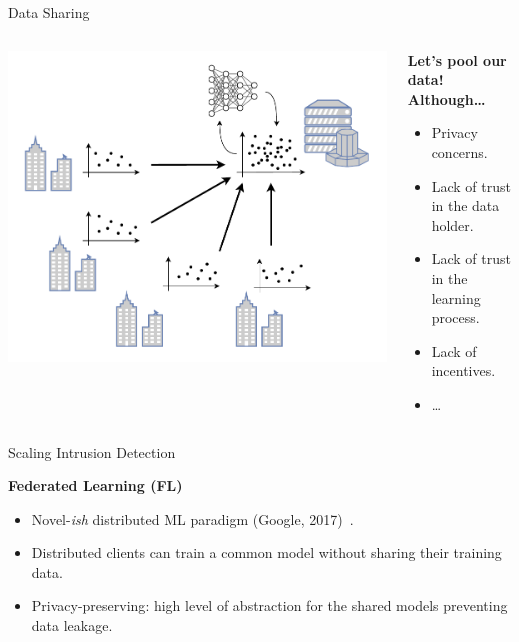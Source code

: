 \begin{frame}{Data Sharing}
\begin{columns}
  \begin{column}{0.5\textwidth}
    \centering
    \includegraphics[width=\linewidth]{figures/intro/collab.pdf}
  \end{column}
  \begin{column}{0.5\textwidth}
    \textbf{Let's pool our data!}\pause{} \textbf{Although\dots}
    \begin{itemize}
      \item Privacy concerns.
      \item Lack of trust in the data holder.
      \item Lack of trust in the learning process.
      \item Lack of incentives.
      \item \dots
    \end{itemize}
  \end{column}
\end{columns}
\end{frame}


\begin{frame}{Scaling Intrusion Detection}

  \textbf{Federated Learning (FL)}
  
  \begin{itemize}[<+->]
    \item Novel-\emph{ish} distributed ML paradigm (Google, 2017)~\autocite{mcmahan_Communicationefficientlearningdeep_2017}.
    \item Distributed clients can train a common model without sharing their training data.
    \item \alert{Privacy-preserving}: high level of abstraction for the shared models preventing data leakage.
  \end{itemize}

\end{frame}


